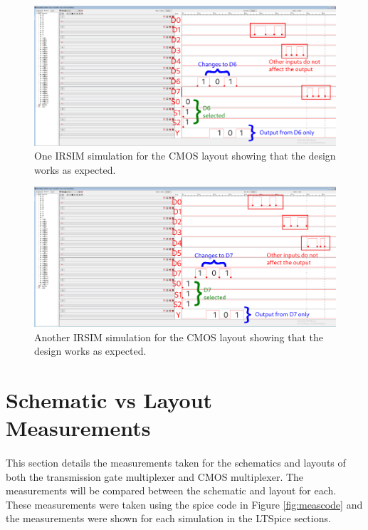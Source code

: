 \documentclass{article}
\begin{document}
    \begin{figure}[H]
      \centering
      \includegraphics[width=\linewidth, frame]{screenshots/cmos/lay/irsim.png}
      \caption{One IRSIM simulation for the CMOS layout showing that the design works as expected.}
      \label{fig:cmoslayirsim1}
    \end{figure}


    \begin{figure}[H]
      \centering
      \includegraphics[width=\linewidth, frame]{screenshots/cmos/lay/irsim2.png}
      \caption{Another IRSIM simulation for the CMOS layout showing that the design works as expected.}
      \label{fig:cmoslayirsim2}
    \end{figure}




\section{Schematic vs Layout Measurements}
  \paragraph{}
  This section details the measurements taken for the schematics and layouts of both the transmission gate multiplexer and CMOS multiplexer. The measurements will be compared between the schematic and layout for each. These measurements were taken using the spice code in Figure \ref{fig:meascode} and the measurements were shown for each simulation in the LTSpice sections.
\end{document}

